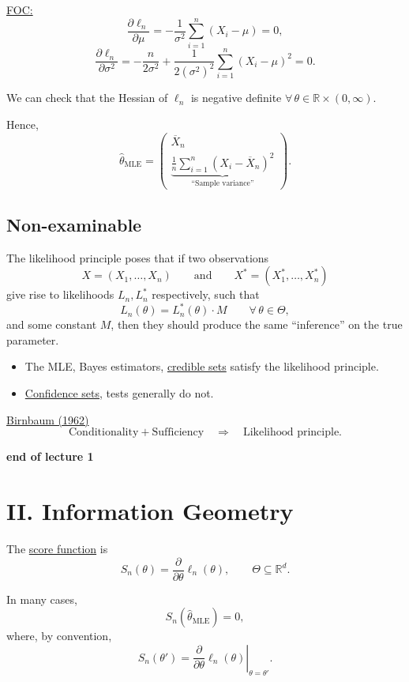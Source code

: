 \documentclass[11pt,a4paper]{article}
\begin{document}
\noindent\underline{FOC:}
\[
\frac{\partial\ell_n}{\partial\mu}
=
-\frac{1}{\sigma^2}
\sum_{i=1}^{n}(X_i-\mu)
=0,
\]
\[
\frac{\partial\ell_n}{\partial\sigma^2}
=
-\frac{n}{2\sigma^2}
+
\frac{1}{2(\sigma^2)^2}
\sum_{i=1}^{n}(X_i-\mu)^2
=0.
\]

We can check that the Hessian of $\ell_n$ is negative definite
$\forall\,\theta\in\mathbb{R}\times(0,\infty)$.

Hence,
\[
\widehat{\theta}_{\mathrm{MLE}}
=
\begin{pmatrix}
\overline{X}_n \\[6pt]
\underbrace{
\displaystyle\frac{1}{n}
\sum_{i=1}^{n}(X_i-\overline{X}_n)^2
}_{\text{``Sample variance''}}
\end{pmatrix}.
\]

\subsection*{Non-examinable}

The likelihood principle poses that if two observations
\[
X=(X_1,\ldots,X_n)
\qquad\text{and}\qquad
X^*=(X_1^*,\ldots,X_n^*)
\]
give rise to likelihoods $L_n,L_n^*$ respectively, such that
\[
L_n(\theta)=L_n^*(\theta)\cdot M
\qquad \forall\,\theta\in\Theta,
\]
and some constant $M$, then they should produce the same
``inference'' on the true parameter.

\begin{itemize}
    \item The MLE, Bayes estimators, \underline{credible sets}
    satisfy the likelihood principle.
    \item \underline{Confidence sets}, tests generally do not.
\end{itemize}

\noindent\underline{Birnbaum (1962)}
\[
\text{Conditionality}+\text{Sufficiency}
\quad\Longrightarrow\quad
\text{Likelihood principle}.
\]

\begin{center}
\textbf{end of lecture 1}
\end{center}

\section*{II. Information Geometry}

The \underline{score function} is
\[
S_n(\theta)
=
\frac{\partial}{\partial\theta}\ell_n(\theta),
\qquad
\Theta\subseteq\mathbb{R}^d.
\]

In many cases,
\[
S_n(\widehat{\theta}_{\mathrm{MLE}})=0,
\]
where, by convention,
\[
S_n(\theta')
=
\left.
\frac{\partial}{\partial\theta}\ell_n(\theta)
\right|_{\theta=\theta'}.
\]
\end{document}
